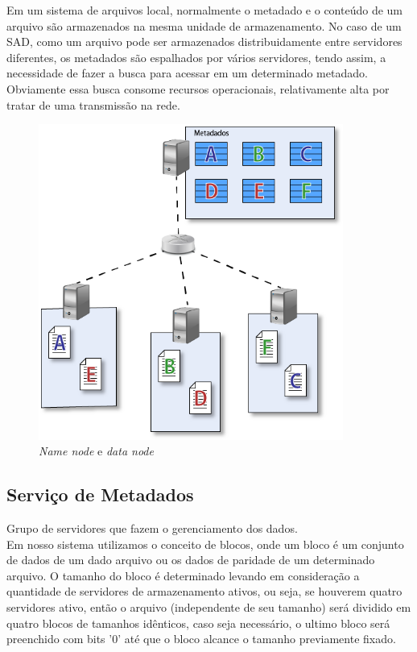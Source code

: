 Em um sistema de arquivos local, normalmente o metadado e o conteúdo de um arquivo são armazenados na mesma unidade de armazenamento. No caso de um SAD, como um arquivo pode ser armazenados distribuidamente entre servidores diferentes, os metadados são espalhados por vários servidores, tendo assim, a necessidade de fazer a busca para acessar em um determinado metadado. Obviamente essa busca consome recursos operacionais, relativamente alta por tratar de uma transmissão na rede.   \\

\begin{figure}[htb]
	\begin{center}
		
		\includegraphics[clip,width=10.0cm]{images/image7.png}
		\caption{\textit{Name node} e \textit{data node}}
		\label{fig:namenode}
	\end{center}
\end{figure}

\subsection{Serviço de Metadados}
Grupo de servidores que fazem o gerenciamento dos dados.\\

Em nosso sistema utilizamos o conceito de blocos, onde um bloco é um conjunto de dados de um dado arquivo ou os dados de paridade de um determinado arquivo. O tamanho do bloco é determinado levando em consideração a quantidade de servidores de armazenamento ativos, ou seja, se houverem quatro servidores ativo, então o arquivo (independente de seu tamanho) será dividido em quatro blocos de tamanhos idênticos, caso seja necessário, o ultimo bloco será preenchido com bits '0' até que o bloco alcance o tamanho previamente fixado.
\\ 

